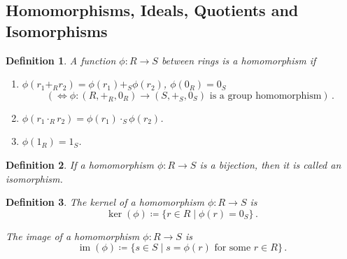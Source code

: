 \documentclass{article}
\theoremstyle{plain}\theoremheaderfont{\normalfont\itshape}\theorembodyfont{\rmfamily}\theoremseparator{.}\newtheorem*{rem}{Remark}\newtheorem*{ex}{Example}\newtheorem*{proof}{Proof}\newtheorem*{altp}{Alternative proof}\newtheorem*{nonex}{Non-Example}
\theoremstyle{plain}\theoremheaderfont{\normalfont\bfseries}\theorembodyfont{\rmfamily}\theoremseparator{.}\newtheorem{thm}{Theorem}[section]\newtheorem{lem}[thm]{Lemma}\newtheorem{prop}[thm]{Proposition}\newtheorem*{cor}{Corollary}\newtheorem{defn}[thm]{Definition}\newtheorem{clm}[thm]{Claim}\newtheorem{clminproof}{Claim}\newtheorem*{notn}{Notation}\newtheorem*{exer}{Exercise}\newtheorem*{lemnn}{Lemma}
\theoremstyle{break}\theoremheaderfont{\normalfont\itshape}\theorembodyfont{\rmfamily}\theoremseparator{.\medskip}\newtheorem*{proofskip}{Proof}\newtheorem*{exs}{Examples}\newtheorem*{rems}{Remarks}\newtheorem*{obs}{Observations}
\theoremstyle{break}\theoremheaderfont{\normalfont\bfseries}\theorembodyfont{\rmfamily}\theoremseparator{.\medskip}\newtheorem{lemskip}[thm]{Lemma}\newtheorem{defnskip}[thm]{Definition}\newtheorem{propskip}[thm]{Proposition}\newtheorem{thmskip}[thm]{Theorem}
\numberwithin{equation}{section}
\DeclareMathOperator*{\im}{im}
\begin{document}
    \subsection{Homomorphisms, Ideals, Quotients and Isomorphisms}
    \begin{defn}
        A function \(\phi:R\to S\) between rings is a \textit{homomorphism} if
        \begin{enumerate}[topsep=0pt,label=(\roman*)]
            \item \(\phi(r_1+_R r_2)=\phi(r_1)+_S \phi(r_2)\), \(\phi(0_R)=0_S\)
            \[(\iff\phi:(R,+_R,0_R)\to (S,+_S,0_S)\text{ is a group homomorphism})\,.\]
            \item \(\phi(r_1\cdot_R r_2)=\phi(r_1)\cdot_S\phi(r_2)\).
            \item \(\phi(1_R)=1_S\).
        \end{enumerate}
    \end{defn}

    \begin{defn}
        If a homomorphism \(\phi:R\to S\) is a bijection, then it is called an \textit{isomorphism}.
    \end{defn}
      
    \begin{defn}
        The \textit{kernel} of a homomorphism \(\phi:R \to S\) is
        \[\ker(\phi)\coloneqq\{r\in R\mid\phi(r)=0_S\}\,.\]
    
        The \textit{image} of a homomorphism \(\phi:R \to S\) is
        \[\im(\phi)\coloneqq\{s\in S\mid s=\phi(r)\text{ for some }r\in R\}\,.\]
    \end{defn}
\end{document}

